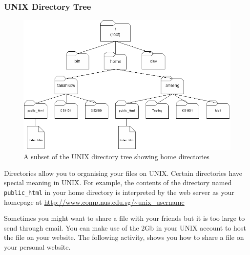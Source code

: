 \documentclass[a4paper]{beamer}
\newcommand{\ftitle}[1]{\frametitle<presentation>{#1}}
\begin{document}
\begin{frame}
\ftitle{UNIX Directory Tree}
\begin{figure}
\begin{center}
\includegraphics[scale=0.4]{file_home}
\end{center}
\caption{A subset of the UNIX directory tree showing home directories}
\label{fig:dir}
\end{figure}
\end{frame}

Directories allow you to organising your files on UNIX.  Certain directories
have special meaning in UNIX. For example, the contents of the directory named
\texttt{public\_html} in your home directory is interpreted by the web server as
your homepage at \url{http://www.comp.nus.edu.sg/~unix_username}

Sometimes you might want to share a file with your friends but it is too large
to send through email. You can make use of the 2Gb in your UNIX account to host
the file on your website. The following activity, shows you how to share a file
on your personal website.  




\end{document}
